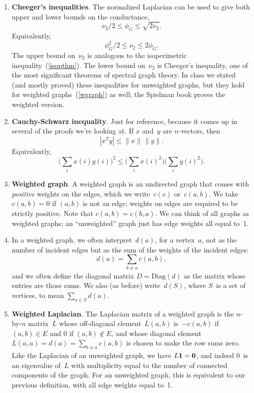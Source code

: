 \documentclass[11pt]{article}
\newcommand{\m}[1]{{\bf{#1}}}       %
\newcommand{\ones}{\m1}             %
\newcommand{\zeros}{\m0}            %
\newcommand{\Diag}{\mbox{Diag}}
\begin{document}
\begin{enumerate}
\item\label{cheeger} {\bf Cheeger's inequalities}.
The normalized Laplacian can be used to give both 
upper and lower bounds on the conductance,
$$\nu_2/2 \leq \phi_G \leq \sqrt{2\nu_2}.$$
Equivalently,
$$\phi_G^2/2 \leq \nu_2 \leq 2\phi_G.$$
The upper bound on~$\nu_2$ is analogous to the
isoperimetric inequality~(\ref{isopthm}).
The lower bound on~$\nu_2$ is Cheeger's inequality,
one of the most significant theorems of spectral
graph theory.
In class we stated (and mostly proved) these
inequalities for unweighted graphs, but they 
hold for weighted graphs~(\ref{wgraph}) as well; 
the Spielman book proves the weighted version.

\item\label{csi} {\bf Cauchy-Schwarz inequality}.
Just for reference, because it comes up in several of
the proofs we're looking at.  
If $x$ and~$y$ are $n$-vectors, then 
$$|x^Ty| \leq \|x\|\,\|y\|.$$
Equivalently,
$$\Big(\sum_i x(i)y(i)\Big)^2 \leq 
\Big(\sum_i x(i)^2\Big)
\Big(\sum_i y(i)^2\Big).$$

\item\label{wgraph}{\bf Weighted graph}.
A weighted graph is an undirected graph that comes 
with {\em positive} weights on the edges, which we write~$c(e)$ or~$c(a,b)$.
We take $c(a,b)=0$ if $(a,b)$ is not an edge; 
weights on edges are required to be strictly positive.
Note that $c(a,b)=c(b,a)$.
We can think of all graphs as weighted graphs;
an ``unweighted'' graph just has edge weights all equal to~1.

\item
In a weighted graph, we often interpret~$d(a)$, for a vertex~$a$,
not as the number of incident edges but as the sum of the weights
of the incident edges:
$$d(a) = \sum_{b \neq a}c(a,b),$$
and we often define the diagonal matrix $D = \Diag(d)$ as the matrix
whose entries are those sums.
We also (as before) write~$d(S)$, where $S$~is a set of vertices, 
to mean $\sum_{a \in S}d(a)$.

\item\label{wlap}{\bf Weighted Laplacian}.
The Laplacian matrix of a weighted graph
is the $n$-by-$n$ matrix~$L$ whose off-diagonal
element~$L(a,b)$ is~$-c(a,b)$ if $(a,b) \in E$ and $0$ if $(a,b) \notin E$,
and whose diagonal element $L(a,a) = d(a) = \sum_{b \neq a}c(a,b)$ 
is chosen to make the row sums zero.
Like the Laplacian of an unweighted graph, we have $L\ones=\zeros$, 
and indeed 0~is an eigenvalue of~$L$ with multiplicity equal to the 
number of connected components of the graph.
For an unweighted graph, this is equivalent to our previous definition,
with all edge weights equal to~1.


\end{enumerate}
\end{document}

